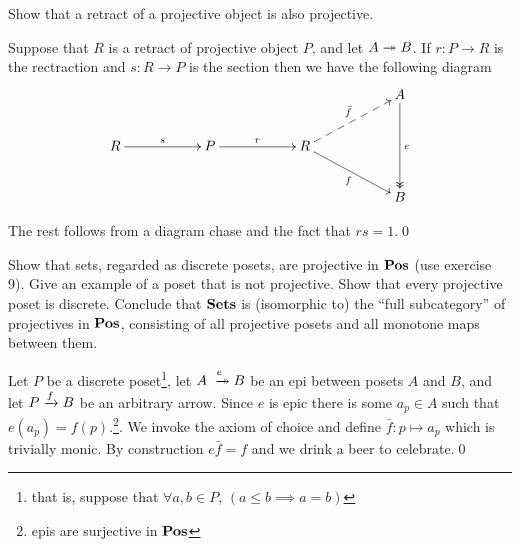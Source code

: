 \setcounter{bookproblem}{6}
\begin{bookproblem}
  Show that a retract of a projective object is also projective.
  \begin{Solution}
    Suppose that \(R\) is a retract of projective object \(P\), and let \(A \twoheadrightarrow
    B\). If \(r:P \to R\) is the rectraction and \(s:R \to P\) is the section
    then we have the following diagram
    \[
      \xymatrix{
                     &&              &&                               && A\ar@{->>}[dd]^e\\
        R\ar[rr]^{s} && P\ar[rr]^{r} && R\ar@{-->}[rru]^{\bar{f}}\ar[rrd]_f &&\\
                     &&              &&                               && B
      }
    \]

    The rest follows from a diagram chase and the fact that \(rs = 1\).\qed{}
  \end{Solution}
\end{bookproblem}

\setcounter{bookproblem}{9}
\begin{bookproblem}
  Show that sets, regarded as discrete posets, are projective in \(\mathbf{{Pos}}\) (use
  exercise 9). Give an example of a poset that is not projective. Show that
  every projective poset is discrete. Conclude that \(\mathbf{{Sets}}\) is (isomorphic to)
  the ``full subcategory'' of projectives in \(\mathbf{{Pos}}\), consisting of all
  projective posets and all monotone maps between them.
  \begin{Solution}
    Let \(P\) be a discrete poset\footnote{that is, suppose that \(\forall a, b
    \in P,\,( a \leq b \implies a = b)\)}, let \(A \xepi{e} B\) be an epi
    between posets \(A\) and \(B\), and let \(P \xrightarrow{f} B\) be an arbitrary
    arrow. Since \(e\) is epic there is some \(a_p \in A\) such that \(e(a_p) =
    f(p)\).\footnote{epis are surjective in \(\mathbf{{Pos}}\)}. We invoke the axiom of
    choice and define \(\bar f: p \mapsto a_p\) which is trivially monic. By
    construction \(e\bar{f} = f\) and we drink a beer to celebrate.\qed{}
  \end{Solution}
\end{bookproblem}

